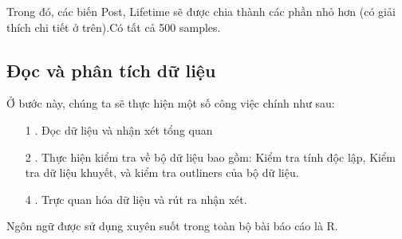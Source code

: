 Trong đó, các biến Post, Lifetime sẽ được chia thành các phần nhỏ hơn (có giải thích chi tiết ở trên).Có tất cả 500 samples.

\subsection{Đọc và phân tích dữ liệu}
Ở bước này, chúng ta sẽ thực hiện một số công việc chính như sau:
\begin{itemize}
    \item [1]. Đọc dữ liệu và nhận xét tổng quan
    \item [2]. Thực hiện kiểm tra về bộ dữ liệu bao gồm: Kiểm tra tính độc lập, Kiểm tra dữ liệu khuyết, và kiểm tra outliners của bộ dữ liệu.
    \item [4]. Trực quan hóa dữ liệu và rút ra nhận xét.
\end{itemize}
Ngôn ngữ được sử dụng xuyên suốt trong toàn bộ bài báo cáo là R.


